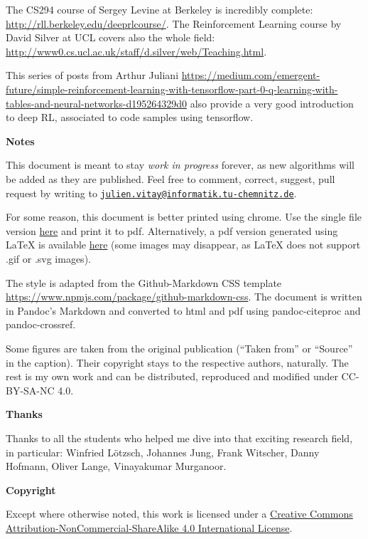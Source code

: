 \documentclass[
  letterpaper,
  DIV=11,
  numbers=noendperiod]{scrreprt}
\begin{document}
The CS294 course of Sergey Levine at Berkeley is incredibly complete:
\url{http://rll.berkeley.edu/deeprlcourse/}. The Reinforcement Learning
course by David Silver at UCL covers also the whole field:
\url{http://www0.cs.ucl.ac.uk/staff/d.silver/web/Teaching.html}.

This series of posts from Arthur Juliani
\url{https://medium.com/emergent-future/simple-reinforcement-learning-with-tensorflow-part-0-q-learning-with-tables-and-neural-networks-d195264329d0}
also provide a very good introduction to deep RL, associated to code
samples using tensorflow.

\textbf{Notes}

This document is meant to stay \emph{work in progress} forever, as new
algorithms will be added as they are published. Feel free to comment,
correct, suggest, pull request by writing to
\href{mailto:julien.vitay@informatik.tu-chemnitz.de}{\nolinkurl{julien.vitay@informatik.tu-chemnitz.de}}.

For some reason, this document is better printed using chrome. Use the
single file version \href{./DeepRL.html}{here} and print it to pdf.
Alternatively, a pdf version generated using LaTeX is available
\href{./DeepRL.pdf}{here} (some images may disappear, as LaTeX does not
support .gif or .svg images).

The style is adapted from the Github-Markdown CSS template
\url{https://www.npmjs.com/package/github-markdown-css}. The document is
written in Pandoc's Markdown and converted to html and pdf using
pandoc-citeproc and pandoc-crossref.

Some figures are taken from the original publication (``Taken from'' or
``Source'' in the caption). Their copyright stays to the respective
authors, naturally. The rest is my own work and can be distributed,
reproduced and modified under CC-BY-SA-NC 4.0.

\textbf{Thanks}

Thanks to all the students who helped me dive into that exciting
research field, in particular: Winfried Lötzsch, Johannes Jung, Frank
Witscher, Danny Hofmann, Oliver Lange, Vinayakumar Murganoor.

\textbf{Copyright}

Except where otherwise noted, this work is licensed under a
\href{http://creativecommons.org/licenses/by-nc-sa/4.0}{Creative Commons
Attribution-NonCommercial-ShareAlike 4.0 International License}.

\end{document}

